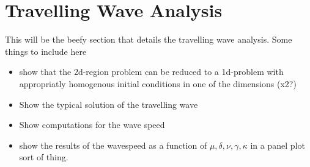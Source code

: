 \section{Travelling Wave Analysis}

This will be the beefy section that details the travelling wave analysis.
Some things to include here
\begin{itemize}
   \item show that the 2d-region problem can be reduced to a 1d-problem with appropriatly homogenous initial conditions in one of the dimensions (x2?)
   \item Show the typical solution of the travelling wave
   \item Show computations for the wave speed
   \item show the results of the wavespeed as a function of $\mu, \delta, \nu, \gamma, \kappa$ in a panel plot sort of thing.
\end{itemize}

